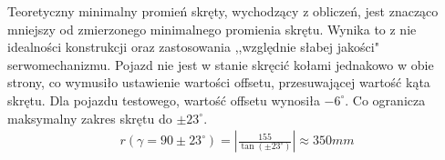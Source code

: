             Teoretyczny minimalny promień skręty, wychodzący z obliczeń, jest znacząco mniejszy od zmierzonego minimalnego promienia skrętu.
            Wynika to z nie idealności konstrukcji oraz zastosowania ,,względnie słabej jakości" serwomechanizmu.
            Pojazd nie jest w stanie skręcić kołami jednakowo w obie strony, co wymusiło ustawienie wartości offsetu, przesuwającej wartość kąta skrętu.
            Dla pojazdu testowego, wartość offsetu wynosiła $-6^\circ$.
            Co ogranicza maksymalny zakres skrętu do $\pm 23^\circ$.
            \begin{gather}
                r(\gamma = 90 \pm 23^\circ) = \left|\frac{155}{\tan(\pm 23^\circ)}\right| \approx 350mm
            \end{gather}




